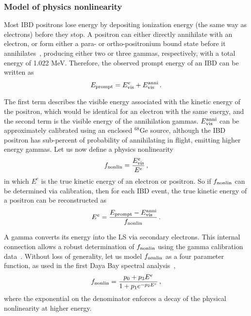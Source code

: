 \documentclass[a4paper,10pt,twoside]{cpc-hepnp}
\begin{document}
\begin{CJK*}{GB}{gbsn}
\begin{multicols}{2}
\subsubsection{Model of physics nonlinearity}
\label{sec:nonlin}
Most IBD positrons lose energy by depositing ionization energy (the
same way as electrons) before they stop. A positron can either
directly annihilate with an electron, or form either a para- or
ortho-positronium bound state before it
annihilates~\cite{borexino-positronium-paper}, producing either two or three
gammas, respectively, with a total energy of 1.022 MeV. Therefore, the
observed prompt energy of an IBD can be written as
\begin{eqnarray}
\label{E_eplus_vis}
E_{\rm prompt} = E_{\rm vis}^{e} + E_{\rm vis}^{\rm anni}\,.
\end{eqnarray}


The first term describes the visible energy associated with the
kinetic energy of the positron, which would be identical for an
electron with the same energy, and the second term is the visible
energy of the annihilation gammas.  $E_{\rm vis}^{\rm anni}$ can be
approximately calibrated using an enclosed $^{68}$Ge source, although
the IBD positron has sub-percent of probability of annihilating in
flight, emitting higher energy gammas. Let us now define a physics
nonlinearity
\begin{equation}
\label{E_nonlin}
f_{\rm nonlin} = \frac{E_{\rm vis}^e}{E^e}\,,
\end{equation}
in which $E^e$ is the true kinetic energy of an electron or
positron. So if $f_{\rm nonlin}$ can be determined via calibration,
then for each IBD event, the true kinetic energy of a positron can be
reconstructed as
\begin{equation}
\label{eq:positron_energy_rec}
E^{e} = \displaystyle\frac{E_{\rm prompt}-E_{\rm vis}^{\rm anni}}{f_{\rm nonlin}}\,.
\end{equation}


A gamma converts its energy into the LS via secondary electrons. This
internal connection allows a robust determination of $f_{\rm nonlin}$
using the gamma calibration
data~\cite{kamland-calibration-paper,dayabay-first-shape-paper}. Without
loss of generality, let us model $f_{\rm nonlin}$ as a four parameter
function, as used in the first Daya Bay spectral
analysis~\cite{dayabay-first-shape-paper},
\begin{eqnarray}
\label{Ele_nonlin}
f_{\rm nonlin} = \frac{p_{0}+p_{3}E^e}{1+p_{1}e^{-p_{2}E^e}}\,, 
\end{eqnarray}
where the exponential on the denominator enforces a decay of the
physical nonlinearity at higher energy.



\end{multicols}
\end{CJK*}
\end{document}
